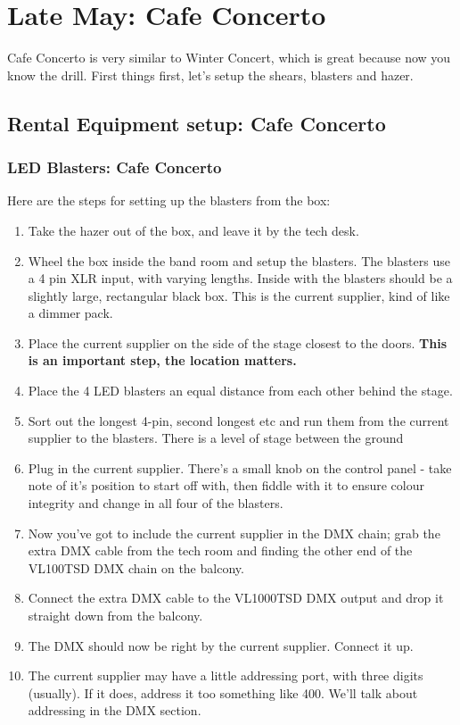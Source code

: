 \documentclass[11pt,a4paper]{book}
\begin{document}
\chapter{Late May: Cafe Concerto}
Cafe Concerto is very similar to Winter Concert, which is great because now you know the drill. First things first, let's setup the shears, blasters and hazer.
\section{Rental Equipment setup: Cafe Concerto}

\subsection{LED Blasters: Cafe Concerto}
Here are the steps for setting up the blasters from the box:
\begin{enumerate}
\item Take the hazer out of the box, and leave it by the tech desk.
\item Wheel the box inside the band room and setup the blasters. The blasters use a 4 pin XLR input, with varying lengths. Inside with the blasters should be a slightly large, rectangular black box. This is the current supplier, kind of like a dimmer pack.
\item Place the current supplier on the side of the stage closest to the doors. \textbf{This is an important step, the location matters.}
\item Place the 4 LED blasters an equal distance from each other behind the stage. 
\item Sort out the longest 4-pin, second longest etc and run them from the current supplier to the blasters. There is a level of stage between the ground
\item Plug in the current supplier. There's a small knob on the control panel - take note of it's position to start off with, then fiddle with it to ensure colour integrity and change in all four of the blasters. 
\item Now you've got to include the current supplier in the DMX chain; grab the extra DMX cable from the tech room and finding the other end of the VL100TSD DMX chain on the balcony.
\item Connect the extra DMX cable to the VL1000TSD DMX output and drop it straight down from the balcony.
\item The DMX should now be right by the current supplier. Connect it up.
\item The current supplier may have a little addressing port, with three digits (usually). If it does, address it too something like 400. We'll talk about addressing in the DMX section.
\end{enumerate}
\end{document}
